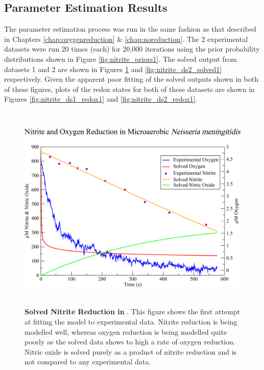 \subsection{Parameter Estimation Results}
The parameter estimation process was run in the same fashion as that described in Chapters \ref{chap:oxygenreduction} \& \ref{chap:noreduction}. The 2 experimental datasets were run 20 times (each) for 20,000 iterations using the prior probability distributions shown in Figure \ref{fig:nitrite_priors1}. The solved output from datasets 1 and 2 are shown in Figures \ref{fig:nitrite_ds1_solved1} and \ref{fig:nitrite_ds2_solved1} respectively. Given the apparent poor fitting of the solved outputs shown in both of these figures, plots of the redox states for both of these datasets are shown in Figures \ref{fig:nitrite_ds1_redox1} and \ref{fig:nitrite_ds2_redox1}.

\begin{figure}[tbp]
 \centering
 \includegraphics[height=10cm, clip=true]{./07-nitritereduction/data/dataset1-1.pdf}
 \caption[Solved Nitrite Reduction in \Nsm{}]{{\bf Solved Nitrite Reduction in \Nsm{}}. This figure shows the first attempt at fitting the model to experimental data. Nitrite reduction is being modelled well, whereas oxygen reduction is being modelled quite poorly as the solved data shows to high a rate of oxygen reduction. Nitric oxide is solved purely as a product of nitrite reduction and is not compared to any experimental data.
  \label{fig:nitrite_ds1_solved1}}
\end{figure}

